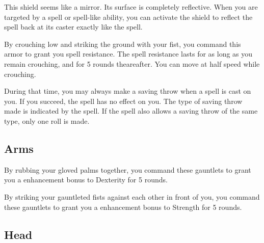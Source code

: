 
 This shield seems like a mirror. Its surface is completely reflective. When you are targeted by a spell or spell-like ability, you can activate the shield to reflect the spell back at its caster exactly like the  spell.


 By crouching low and striking the ground with your fist, you command this armor to grant you spell resistance. The spell resistance lasts for as long as you remain crouching, and for 5 rounds theareafter. You can move at half speed while crouching.

During that time, you may always make a saving throw when a spell is cast on you. If you succeed, the spell has no effect on you. The type of saving throw made is indicated by the spell. If the spell also allows a saving throw of the same type, only one roll is made.


\subsection{Arms}

 By rubbing your gloved palms together, you command these gauntlets to grant you a  enhancement bonus to Dexterity for 5 rounds.


 By striking your gauntleted fists against each other in front of you, you command these gauntlets to grant you a  enhancement bonus to Strength for 5 rounds.


\subsection{Head}

